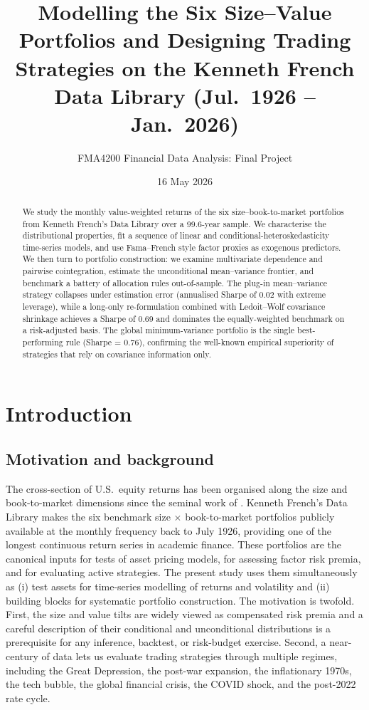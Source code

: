 \documentclass[11pt,a4paper]{article}
\title{\textbf{Modelling the Six Size--Value Portfolios and Designing Trading Strategies on the Kenneth French Data Library (Jul.\ 1926 -- Jan.\ 2026)}}
\author{FMA4200 Financial Data Analysis: Final Project}
\date{16 May 2026}
\begin{document}
\maketitle

\begin{abstract}
\noindent We study the monthly value-weighted returns of the six size--book-to-market portfolios from Kenneth French's Data Library over a 99.6-year sample. We characterise the distributional properties, fit a sequence of linear and conditional-heteroskedasticity time-series models, and use Fama--French style factor proxies as exogenous predictors. We then turn to portfolio construction: we examine multivariate dependence and pairwise cointegration, estimate the unconditional mean--variance frontier, and benchmark a battery of allocation rules out-of-sample. The plug-in mean--variance strategy collapses under estimation error (annualised Sharpe of 0.02 with extreme leverage), while a long-only re-formulation combined with Ledoit--Wolf covariance shrinkage achieves a Sharpe of 0.69 and dominates the equally-weighted benchmark on a risk-adjusted basis. The global minimum-variance portfolio is the single best-performing rule (Sharpe = 0.76), confirming the well-known empirical superiority of strategies that rely on covariance information only.
\end{abstract}

\section{Introduction}

\subsection{Motivation and background}
The cross-section of U.S.\ equity returns has been organised along the size and book-to-market dimensions since the seminal work of \citet{FamaFrench1992,FamaFrench1993}. Kenneth French's Data Library makes the six benchmark size $\times$ book-to-market portfolios publicly available at the monthly frequency back to July 1926, providing one of the longest continuous return series in academic finance. These portfolios are the canonical inputs for tests of asset pricing models, for assessing factor risk premia, and for evaluating active strategies. The present study uses them simultaneously as (i) test assets for time-series modelling of returns and volatility and (ii) building blocks for systematic portfolio construction. The motivation is twofold. First, the size and value tilts are widely viewed as compensated risk premia and a careful description of their conditional and unconditional distributions is a prerequisite for any inference, backtest, or risk-budget exercise. Second, a near-century of data lets us evaluate trading strategies through multiple regimes, including the Great Depression, the post-war expansion, the inflationary 1970s, the tech bubble, the global financial crisis, the COVID shock, and the post-2022 rate cycle.
\end{document}
